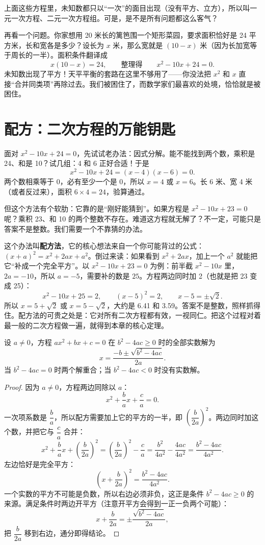 上面这些方程里，未知数都只以“一次”的面目出现（没有平方、立方），所以叫一元一次方程、二元一次方程组。可是，是不是所有问题都这么客气？

再看一个问题。你家想用 20 米长的篱笆围一个矩形菜园，要求面积恰好是 24 平方米，长和宽各是多少？设长为 $x$ 米，那么宽就是 $(10 - x)$ 米（因为长加宽等于周长的一半）。面积条件翻译成
\[
x(10 - x) = 24,\qquad \text{整理得}\qquad x^2 - 10x + 24 = 0.
\]
未知数出现了平方！天平平衡的套路在这里不够用了——你没法把 $x^2$ 和 $x$ 直接“合并同类项”再除过去。我们被困住了，而数学家们最喜欢的处境，恰恰就是被困住。

\section{配方：二次方程的万能钥匙}

面对 $x^2 - 10x + 24 = 0$，先试试老办法：因式分解。能不能找到两个数，乘积是 24、和是 10？试几组：4 和 6 正好合适！于是
\[
x^2 - 10x + 24 = (x - 4)(x - 6) = 0.
\]
两个数相乘等于 0，必有至少一个是 0，所以 $x = 4$ 或 $x = 6$。长 6 米、宽 4 米（或者反过来），面积 $6 \times 4 = 24$，验算通过。

但这个方法有个软肋：它靠的是“刚好能猜到”。如果方程是 $x^2 - 10x + 23 = 0$ 呢？乘积 23、和 10 的两个整数不存在。难道这方程就无解了？不一定，可能只是答案不是整数。我们需要一个不靠猜的办法。

这个办法叫\textbf{配方法}，它的核心想法来自一个你可能背过的公式：$(x + a)^2 = x^2 + 2ax + a^2$。倒过来读：如果看到 $x^2 + 2ax$，加上一个 $a^2$ 就能把它“补成一个完全平方”。以 $x^2 - 10x + 23 = 0$ 为例：前半截 $x^2 - 10x$ 里，$2a = -10$，所以 $a = -5$，需要补的数是 $25$。方程两边同时加 2（也就是把 23 变成 25）：
\[
x^2 - 10x + 25 = 2,\qquad (x - 5)^2 = 2,\qquad x - 5 = \pm\sqrt{2}.
\]
所以 $x = 5 + \sqrt{2}$ 或 $x = 5 - \sqrt{2}$，大约是 6.41 和 3.59。答案不是整数，照样抓得住。配方法的可贵之处是：它对所有二次方程都有效，一视同仁。把这个过程对着最一般的二次方程做一遍，就得到本章的核心定理。

\begin{dingli}[一元二次方程求根公式]
设 $a \neq 0$，方程 $ax^2 + bx + c = 0$ 在 $b^2 - 4ac \geq 0$ 时的全部实数解为
\[
x = \frac{-b \pm \sqrt{b^2 - 4ac}}{2a}.
\]
当 $b^2 - 4ac = 0$ 时两个解重合；当 $b^2 - 4ac < 0$ 时没有实数解。
\end{dingli}

\begin{proof}
因为 $a \neq 0$，方程两边同除以 $a$：
\[
x^2 + \frac{b}{a}x + \frac{c}{a} = 0.
\]
一次项系数是 $\dfrac{b}{a}$，所以配方需要加上它的平方的一半，即 $\left(\dfrac{b}{2a}\right)^2$。两边同时加这个数，并把它与 $\dfrac{c}{a}$ 合并：
\[
x^2 + \frac{b}{a}x + \left(\frac{b}{2a}\right)^2 = \left(\frac{b}{2a}\right)^2 - \frac{c}{a}
= \frac{b^2}{4a^2} - \frac{4ac}{4a^2} = \frac{b^2 - 4ac}{4a^2}.
\]
左边恰好是完全平方：
\[
\left(x + \frac{b}{2a}\right)^2 = \frac{b^2 - 4ac}{4a^2}.
\]
一个实数的平方不可能是负数，所以右边必须非负，这正是条件 $b^2 - 4ac \geq 0$ 的来源。满足条件时两边开平方（注意开平方会得到一正一负两个可能）：
\[
x + \frac{b}{2a} = \pm\frac{\sqrt{b^2 - 4ac}}{2a},
\]
把 $\dfrac{b}{2a}$ 移到右边，通分即得结论。
\end{proof}

